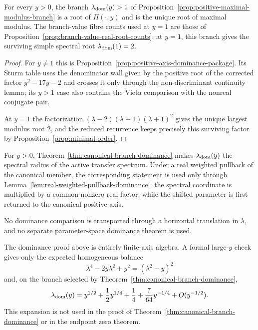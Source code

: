 \begin{theorem}\label{thm:canonical-branch-dominance}\label{eq:consolidated-disc-factor}
For every $y>0$, the branch $\lambda_{\rm dom}(y)>1$ of Proposition~\ref{prop:positive-maximal-modulus-branch} is a root of $\Pi(\cdot,y)$ and is the unique root of maximal modulus.  The branch-value fibre counts used at $y=1$ are those of Proposition~\ref{prop:branch-value-real-root-counts}; at $y=1$, this branch gives the surviving simple spectral root $\lambda_{\rm dom}(1)=2$.
\end{theorem}
\begin{proof}
For $y\ne1$ this is Proposition~\ref{prop:positive-axis-dominance-package}.  Its Sturm table uses the denominator wall given by the positive root of the corrected factor $y^2-17y-2$ and crosses it only through the non-discriminant continuity lemma; its $y>1$ case also contains the Vieta comparison with the nonreal conjugate pair.

At $y=1$ the factorization $(\lambda-2)(\lambda-1)(\lambda+1)^2$ gives the unique largest modulus root $2$, and the reduced recurrence keeps precisely this surviving factor by Proposition~\ref{prop:minimal-order}.
\end{proof}

\begin{remark}\label{cor:positive-axis-spectral-radius-reduction}\label{cor:normalized-branch-classification}\label{eq:carried-normalized-branch-change}\label{prop:positive-side-real-scaling-stability}
For $y>0$, Theorem~\ref{thm:canonical-branch-dominance} makes $\lambda_{\rm dom}(y)$ the spectral radius of the active transfer spectrum.  Under a real weighted pullback of the canonical member, the corresponding statement is used only through Lemma~\ref{lem:real-weighted-pullback-dominance}: the spectral coordinate is multiplied by a common nonzero real factor, while the shifted parameter is first returned to the canonical positive axis.

No dominance comparison is transported through a horizontal translation in $\lambda$, and no separate parameter-space dominance theorem is used.
\end{remark}

\begin{remark}\label{rem:projective-infinity-consistency-short}\label{lem:projective-infinity-consistency}
The dominance proof above is entirely finite-axis algebra.  A formal large-$y$ check gives only the expected homogeneous balance
\[
\lambda^4-2y\lambda^2+y^2=(\lambda^2-y)^2
\]
and, on the branch selected by Theorem~\ref{thm:canonical-branch-dominance},
\[
\lambda_{\rm dom}(y)=y^{1/2}+\frac12y^{1/4}+\frac14+\frac{7}{64}y^{-1/4}+O(y^{-1/2}).
\]
This expansion is not used in the proof of Theorem~\ref{thm:canonical-branch-dominance} or in the endpoint zero theorem.
\end{remark}


